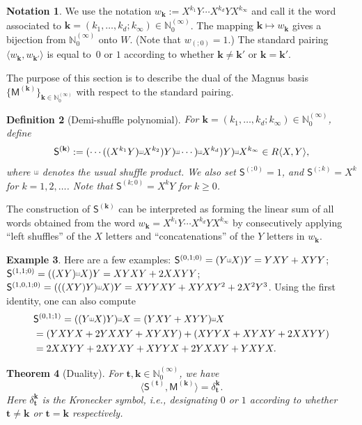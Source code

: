 \documentclass[10pt]{article}
\newtheorem{Theorem}{Theorem}[section]
\newtheorem{Definition}[Theorem]{Definition}
\theoremstyle{definition}
\newtheorem{Notation}[Theorem]{Notation}
\newtheorem{Example}[Theorem]{Example}
\theoremstyle{remark}
\def\bk{{\mathbf{k}}}
\def\MM{{\mathsf{M}}}
\def\SS{{\mathsf{S}}}
\def\bt{{\mathbf{t}}}
\def\lp{\langle}
\def\rp{\rangle}
\def\N{{\mathbb N}}
\def\la{\langle}
\def\ra{\rangle}
\def\sha{\scalebox{0.6}[0.8]{\rotatebox[origin=c]{-90}{$\exists$}}}
\begin{document}
\begin{Notation} We use the notation $w_\bk:=X^{k_1}Y\cdots X^{k_d}YX^{k_\infty}$
and call it the word associated to $\bk=(k_1,\dots,k_d; k_\infty)\in\N_0^{(\infty)}$.
The mapping $\bk\mapsto w_\bk$ gives a bijection from $\N_0^{(\infty)}$ onto $W$.
(Note that $w_{(;0)}=1$.)
The standard pairing $\lp w_\bk,w_{\bk'}\rp$ is equal to~$0$ or $1$ 
according to whether $\bk\ne \bk'$ or $\bk=\bk'$.
\end{Notation}


The purpose of this section is to describe the dual of the 
Magnus basis
$\{\MM^{(\bk)}\}_{\bk\in \N_0^{(\infty)}}$ with respect to the standard
pairing.

 
\begin{Definition}[Demi-shuffle polynomial]
\label{demi-shuffle}
For $\bk=(k_1,\dots,k_d; k_\infty)\in\N_0^{(\infty)}$, define
$$
\SS^{(\bk)}:=
(\cdots((X^{k_1}Y)\sha X^{k_2})Y)\sha\cdots)\sha  X^{k_d})Y)\sha
X^{k_\infty} \in R\la X,Y\ra,
$$
where $\sha$ denotes the usual shuffle product. 
We also set $\SS^{(;0)}=1$, and $\SS^{(;k)}=X^k$ for $k=1,2,\dots$.
Note that $\SS^{(k;0)}=X^kY$ for $k\ge 0$.
\end{Definition}

The construction of $\SS^{(\bk)}$ can be interpreted 
as forming the linear sum
of all words obtained from 
the word
$w_\bk=X^{k_1}Y\cdots X^{k_d}YX^{k_\infty}$
by consecutively applying ``left shuffles'' of the $X$ letters
and ``concatenations'' of the $Y$ letters in $w_\bk$.

\begin{Example}
Here are a few examples:
$\SS^{(0,1;0)}=(Y\sha X)Y=YXY+XYY$;
$\SS^{(1,1;0)}=((XY)\sha X)Y=XYXY+2XXYY$;
$\SS^{(1,0,1;0)}=(((XY)Y)\sha X)Y=XYYXY+XYXY^2+2X^2Y^3$.
Using the first identity, one can also compute
\begin{align*}
&\SS^{(0,1;1)}=((Y\sha X)Y)\sha X=(YXY+XYY)\sha X \\
&=(YXYX+2YXXY+XYXY)+(XYYX+XYXY+2XXYY) \\
&=2XXYY+2XYXY+XYYX+2YXXY+YXYX.
\end{align*}
\end{Example}

\begin{Theorem}[Duality] \label{orthogonality}
For $\bt, \bk\in \N_0^{(\infty)}$, we have
$$
\lp \SS^{(\bt)},\MM^{(\bk)}\rp=\delta_\bt^{\bk}.
$$
Here $\delta_\bt^{\bk}$ is the Kronecker symbol, i.e., designating $0$ or $1$
according to whether $\bt\ne\bk$ or $\bt=\bk$ respectively.
\end{Theorem}
\end{document}
